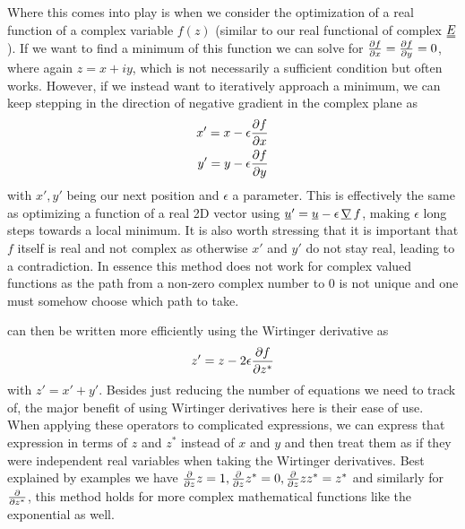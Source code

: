 \documentclass[12pt]{article}
\newcommand{\suf}[2]{\stackunder[0.5pt]{\stackunder[1pt]{\ensuremath{#1}}{\rule{\widthof{\ensuremath{#2}}*\real{0.9}}{.1ex}}}{}}
\newcommand{\duf}[2]{\stackunder[0.5pt]{\stackunder[0.8pt]{\stackunder[1pt]{\ensuremath{#1}}{\rule{\widthof{\ensuremath{#2}}*\real{0.9}}{.1ex}}}{\rule{\widthof{\ensuremath{#2}}*\real{0.9}}{.1ex}}}{}}
\newcommand{\su}[1]{\suf{#1}{#1}}
\newcommand{\du}[1]{\duf{#1}{#1}}
\newcommand{\mgrad}{\ensuremath{\suf{\nabla}{K}\,}}
\newcommand{\EE}{\ensuremath{\du{E}}}
\begin{document}
        Where this comes into play is when we consider the optimization of a real function of a complex variable $f(z)$ (similar to our real functional of complex \EE).
        If we want to find a minimum of this function we can solve for $\pdv{f}{x} = \pdv{f}{y} = 0$, where again $z=x+iy$, which is not necessarily a sufficient condition but often works.
        However, if we instead want to iteratively approach a minimum, we can keep stepping in the direction of negative gradient in the complex plane as
        \begin{align}
            x' = x - \epsilon\pdv{f}{x}\label{eq:random1} \\
            y' = y - \epsilon\pdv{f}{y}\label{eq:random2}
        \end{align}
        with $x', y'$ being our next position and $\epsilon$ a parameter.
        This is effectively the same as optimizing a function of a real 2D vector using $\su{u}' = \su{u} - \epsilon \, \mgrad f$, making $\epsilon$ long steps towards a local minimum.
        It is also worth stressing that it is important that $f$ itself is real and not complex as otherwise $x'$ and $y'$ do not stay real, leading to a contradiction.
        In essence this method does not work for complex valued functions as the path from a non-zero complex number to 0 is not unique and one must somehow choose which path to take.

         can then be written more efficiently using the Wirtinger derivative as
        \begin{equation}
            z' = z - 2\epsilon \pdv{f}{z^*}
        \end{equation}
        with $z' = x' + y'$.
        Besides just reducing the number of equations we need to track of, the major benefit of using Wirtinger derivatives here is their ease of use.
        When applying these operators to complicated expressions, we can express that expression in terms of $z$ and $z^*$ instead of $x$ and $y$ and then treat them as if they were independent real variables when taking the Wirtinger derivatives.
        Best explained by examples we have $\pdv{z} z = 1, \pdv{z} z^* = 0, \pdv{z} z z^* = z^*$ and similarly for $\pdv{z^*}$, this method holds for more complex mathematical functions like the exponential as well.
\end{document}
